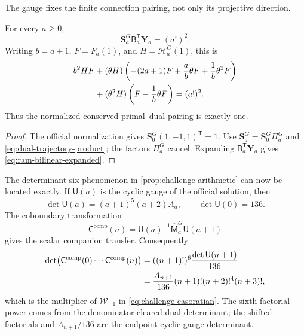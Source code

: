 The gauge fixes the finite connection pairing, not only its projective
direction.

\begin{theorem}
\label{thm:ram-bilinear}
For every \(a\ge0\),
\begin{equation}\label{eq:ram-bilinear-matrix}
 \boxed{\displaystyle
 \mathbf S_a^G\mathsf B_a^{\mathsf T}\mathbf Y_a=(a!)^2.}
\end{equation}
Writing \(b=a+1\), \(F=F_a(1)\), and
\(H=\mathcal H_a^G(1)\), this is
\begin{align}
 b^2HF
 &+(\theta H)\left(-(2a+1)F+\frac ab\theta F
                         +\frac1b\theta^2F\right)\notag\\
 &+(\theta^2H)\left(F-\frac1b\theta F\right)=(a!)^2.
 \label{eq:ram-bilinear-expanded}
\end{align}
Thus the normalized conserved primal--dual pairing is exactly one.
\end{theorem}

\begin{proof}
The official normalization gives
\(\mathbf S_0^G(1,-1,1)^{\mathsf T}=1\).  Use
\(\mathbf S_a^G=\mathbf S_0^G\Pi_a^G\) and
\eqref{eq:dual-trajectory-product}; the factors \(\Pi_a^G\) cancel.
Expanding \(\mathsf B_a^{\mathsf T}\mathbf Y_a\) gives
\eqref{eq:ram-bilinear-expanded}.
\end{proof}

The determinant-six phenomenon in \cref{prop:challenge-arithmetic} can now
be located exactly.  If \(\mathsf U(a)\) is the cyclic gauge of the official
solution, then
\begin{equation}\label{eq:cyclic-gauge-det}
 \det\mathsf U(a)=(a+1)^5(a+2)A_a,\qquad \det\mathsf U(0)=136.
\end{equation}
The coboundary transformation
\begin{equation}\label{eq:companion-gauge-definition}
 \mathsf C^{\mathrm{comp}}(a)=
 \mathsf U(a)^{-1}\widehat{\mathsf M}_a^G\mathsf U(a+1)
\end{equation}
gives the scalar companion transfer.  Consequently
\begin{align}
 \det\bigl(\mathsf C^{\mathrm{comp}}(0)\cdots
                 \mathsf C^{\mathrm{comp}}(n)\bigr)
 &=((n+1)!)^6\frac{\det\mathsf U(n+1)}{136}\notag\\
 &=\frac{A_{n+1}}{136}(n+1)!(n+2)!^4(n+3)!,
 \label{eq:casoratian-gauge-origin}
\end{align}
which is the multiplier of \(\mathcal W_{-1}\) in
\eqref{eq:challenge-casoratian}.  The sixth factorial power comes from the
denominator-cleared dual determinant; the shifted factorials and
\(A_{n+1}/136\) are the endpoint cyclic-gauge determinant.

